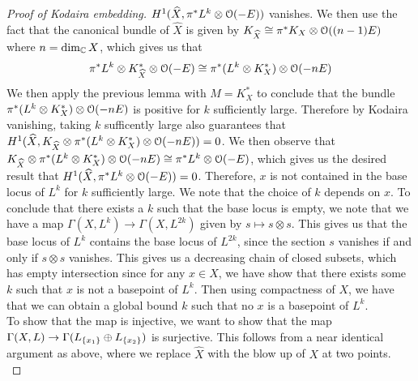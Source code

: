 \begin{proof}[Proof of Kodaira embedding]
$H^1(\widehat{X},\pi^*L^k\otimes\mathcal{O}(-E))$ vanishes. We then use the fact that the
canonical bundle of $\widehat{X}$ is given by
$K_{\widehat{X}} \cong \pi^*K_X \otimes \mathcal{O}((n-1)E)$ where $n = \dim_{\mathbb{C}} X$,
which gives us that
\[
\pi^*L^k\otimes K^*_{\widehat{X}}\otimes\mathcal{O}(-E)\cong\pi^*(L^k\otimes K^*_X)\otimes\mathcal{O}(-nE)
\]
We then apply the previous lemma with $M = K^*_X$ to conclude that
the bundle $\pi^*(L^k\otimes K^*_X)\otimes\mathcal{O}(-nE)$ is positive for $k$ sufficiently
large. Therefore by Kodaira vanishing, taking $k$ sufficently large also
guarantees that
$H^1(\widehat{X},K_{\widehat{X}} \otimes \pi^*(L^k\otimes K^*_X)\otimes\mathcal{O}(-nE)) = 0$.
We then observe that
$K_{\widehat{X}}\otimes\pi^*(L^k\otimes K^*_X)\otimes\mathcal{O}(-nE)\cong\pi^*L^k\otimes\mathcal{O}(-E)$,
which gives us the desired result that $H^1(\widehat{X},\pi^*L^k\otimes\mathcal{O}(-E)) = 0$.
Therefore, $x$ is not contained in the base locus of $L^k$ for $k$ sufficiently large.
We note that the choice of $k$ depends on $x$. To conclude that there exists
a $k$ such that the base locus is empty, we note that we have a map
$\Gamma(X,L^k) \to \Gamma(X,L^{2k})$ given by $s \mapsto s \otimes s$.
This gives us that the base locus of $L^k$ contains the base locus of $L^{2k}$,
since the section $s$ vanishes if and only if $s \otimes s$ vanishes.
This gives us a decreasing chain of closed subsets, which has empty intersection
since for any $x \in X$, we have show that there exists some $k$ such that
$x$ is not a basepoint of $L^k$. Then using compactness of $X$, we have
that we can obtain a global bound $k$ such that no $x$ is a basepoint of $L^k$. \\

To show that the map is injective, we want to show that the map
$\Gamma(X,L) \to \Gamma(L_{\left\lbrace x_1 \right\rbrace} \oplus L_{\left\lbrace x_2 \right\rbrace})$ is surjective.
This follows from a near identical argument as above, where we replace
$\widehat{X}$ with the blow up of $X$ at two points. \\


\end{proof}
